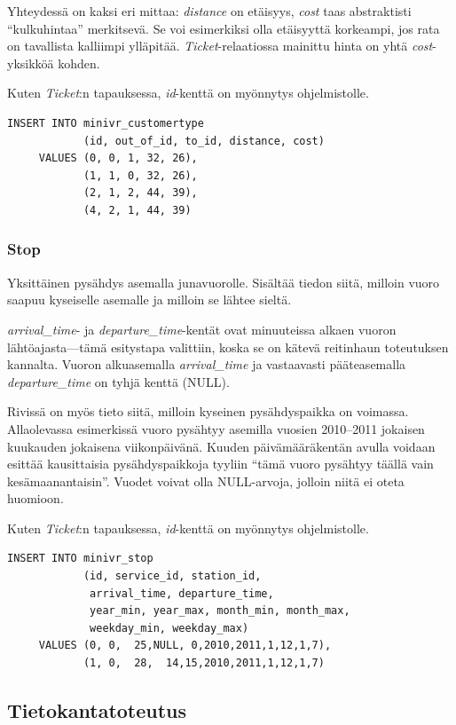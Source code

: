 \documentclass[a4paper,twoside,titlepage,12pt]{article}
\begin{document}
Yhteydessä on kaksi eri mittaa: \emph{distance} on etäisyys, \emph{cost} taas
abstraktisti ``kulkuhintaa'' merkitsevä. Se voi esimerkiksi olla etäisyyttä
korkeampi, jos rata on tavallista kalliimpi ylläpitää.
\emph{Ticket}-relaatiossa mainittu hinta on yhtä \emph{cost}-yksikköä kohden.

Kuten \emph{Ticket}:n tapauksessa, \emph{id}-kenttä on myönnytys ohjelmistolle.

\begin{lstlisting}
INSERT INTO minivr_customertype
            (id, out_of_id, to_id, distance, cost)
     VALUES (0, 0, 1, 32, 26),
            (1, 1, 0, 32, 26),
            (2, 1, 2, 44, 39),
            (4, 2, 1, 44, 39)
\end{lstlisting}

\subsubsection{Stop}

Yksittäinen pysähdys asemalla junavuorolle. Sisältää tiedon siitä, milloin
vuoro saapuu kyseiselle asemalle ja milloin se lähtee sieltä.

\emph{arrival\_time}- ja \emph{departure\_time}-kentät ovat minuuteissa alkaen
vuoron lähtöajasta---tämä esitystapa valittiin, koska se on kätevä reitinhaun
toteutuksen kannalta. Vuoron alkuasemalla \emph{arrival\_time} ja vastaavasti
pääteasemalla \emph{departure\_time} on tyhjä kenttä (NULL).

Rivissä on myös tieto siitä, milloin kyseinen pysähdyspaikka on voimassa.
Allaolevassa esimerkissä vuoro pysähtyy asemilla vuosien 2010--2011 jokaisen
kuukauden jokaisena viikonpäivänä. Kuuden päivämääräkentän avulla voidaan
esittää kausittaisia pysähdyspaikkoja tyyliin ``tämä vuoro pysähtyy täällä vain
kesämaanantaisin''. Vuodet voivat olla NULL-arvoja, jolloin niitä ei oteta
huomioon.

Kuten \emph{Ticket}:n tapauksessa, \emph{id}-kenttä on myönnytys ohjelmistolle.

\begin{lstlisting}
INSERT INTO minivr_stop
            (id, service_id, station_id,
             arrival_time, departure_time,
             year_min, year_max, month_min, month_max,
             weekday_min, weekday_max)
     VALUES (0, 0,  25,NULL, 0,2010,2011,1,12,1,7),
            (1, 0,  28,  14,15,2010,2011,1,12,1,7)
\end{lstlisting}

\subsection{Tietokantatoteutus}
\end{document}

